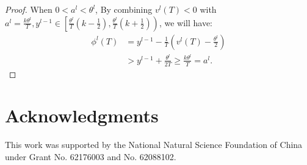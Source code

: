 \documentclass[letterpaper]{article} %
\begin{document}
\begin{proof}
When $0<a^l<\theta^l$, By combining ${v}^l(T)<0$ with ${a}^l=\frac{k{\theta}^l}{T}, y^{l-1}\in \left[\frac{{\theta}^l}{T}(k-\frac{1}{2}),\frac{{\theta}^l}{T}(k+\frac{1}{2})\right)$, we will have:
\begin{align}
    \phi^l(T) &= {y}^{l-1} - \frac{1}{T}\left({v}^l(T)-\frac{{\theta}^l}{2}\right) \nonumber \\
    &> {y}^{l-1} + \frac{\theta^l}{2T} \geqslant \frac{k{\theta}^l}{T} = {a}^l.
\end{align}
\end{proof}

\section{Acknowledgments}
This work was supported by the National Natural Science Foundation of China under Grant No. 62176003 and No. 62088102.

%

\end{document}
